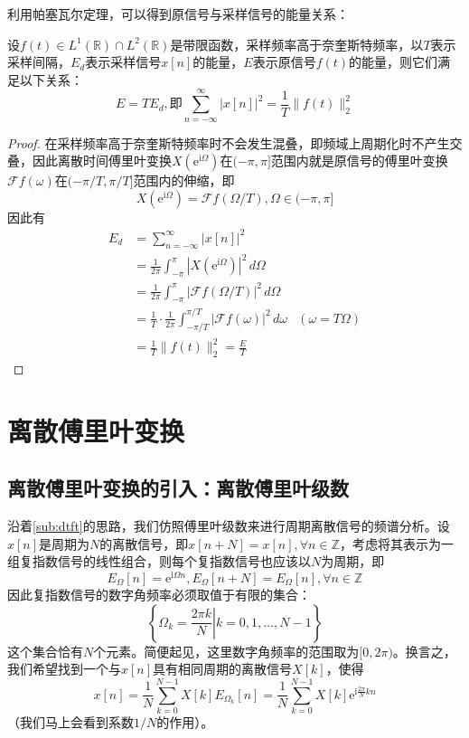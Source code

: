 \documentclass{ctexbook}
\begin{document}
利用帕塞瓦尔定理，可以得到原信号与采样信号的能量关系：

\begin{theorem}
    设$f(t)\in L^1(\mathbb{R})\cap L^2(\mathbb{R})$是带限函数，采样频率高于奈奎斯特频率，以$T$表示采样间隔，$E_d$表示采样信号$x[n]$的能量，$E$表示原信号$f(t)$的能量，则它们满足以下关系：
    \[E=TE_d,\text{即}\sum_{n=-\infty}^{\infty}|x[n]|^2=\frac{1}{T}\|f(t)\|_2^2\]
\end{theorem}
\begin{proof}
    在采样频率高于奈奎斯特频率时不会发生混叠，即频域上周期化时不产生交叠，因此离散时间傅里叶变换$X(\mathrm{e}^{\mathrm{i}\Omega})$在$(-\pi,\pi]$范围内就是原信号的傅里叶变换$\mathcal{F} f(\omega)$在$(-\pi/T,\pi/T]$范围内的伸缩，即
    \[X(\mathrm{e}^{\mathrm{i}\Omega})=\mathcal{F} f(\Omega/T),\Omega\in(-\pi,\pi]\]
    因此有
    \begin{align*}
        E_d&=\sum_{n=-\infty}^{\infty}|x[n]|^2\\
        &=\frac{1}{2\pi}\int_{-\pi}^{\pi}|X(\mathrm{e}^{\mathrm{i}\Omega})|^2\,d\Omega\\
        &=\frac{1}{2\pi}\int_{-\pi}^{\pi}|\mathcal{F} f(\Omega/T)|^2\,d\Omega\\
        &=\frac{1}{T}\cdot\frac{1}{2\pi}\int_{-\pi/T}^{\pi/T}|\mathcal{F} f(\omega)|^2\,d\omega&(\omega=T\Omega)\\
        &=\frac{1}{T}\|f(t)\|_2^2=\frac{E}{T}
    \end{align*}
\end{proof}

\section{离散傅里叶变换}\label{sec:DFT}

\subsection{离散傅里叶变换的引入：离散傅里叶级数}\label{sub:intro_DFT}

沿着\ref{sub:dtft}的思路，我们仿照傅里叶级数来进行周期离散信号的频谱分析。设$x[n]$是周期为$N$的离散信号，即$x[n+N]=x[n],\forall n\in\mathbb{Z}$，考虑将其表示为一组复指数信号的线性组合，则每个复指数信号也应该以$N$为周期，即
\[E_{\Omega}[n]=\mathrm{e}^{\mathrm{i}\Omega n},E_{\Omega}[n+N]=E_{\Omega}[n],\forall n\in\mathbb{Z}\]
因此复指数信号的数字角频率必须取值于有限的集合：
\[\left\{\left.\Omega_k=\frac{2\pi k}{N}\right|k=0,1,\dots,N-1\right\}\]
这个集合恰有$N$个元素。简便起见，这里数字角频率的范围取为$[0,2\pi)$。换言之，我们希望找到一个与$x[n]$具有相同周期的离散信号$X[k]$，使得
\[x[n]=\frac{1}{N}\sum_{k=0}^{N-1}X[k]E_{\Omega_k}[n]=\frac{1}{N}\sum_{k=0}^{N-1}X[k]\mathrm{e}^{\mathrm{i}\frac{2\pi}{N}kn}\]
（我们马上会看到系数$1/N$的作用）。
\end{document}
